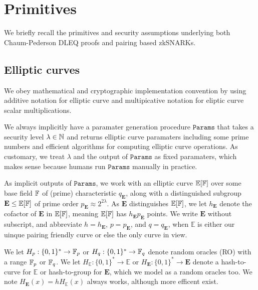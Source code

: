 
\section{Primitives}
\label{sec:lambda}

\def\ecE{{\mathbb{E}}}
\def\grE{{\mathbf{E}}}
\def\genE{E}
\def\genG{G}
\def\genB{K} %

\def\ecJ{{\mathbb{J}}}
\def\grJ{{\mathbf{J}}}
\def\genJ{J}

We briefly recall the primitives and security assumptions underlying
both Chaum-Pederson DLEQ proofs and pairing based zkSNARKs. 


\subsection{Elliptic curves}

We obey mathematical and cryptographic implementation convention by using additive notation for elliptic curve and multipicative notation for eliptic curve scalar multiplications. 

We always implicitly have a paramater generation procedure $\mathtt{Params}$ that takes a security level $\lambda \in \mathbb{N}$ and returns elliptic curve paramaters including some prime numbers and efficient algorithms for computing elliptic curve operations.  As customary, we treat $\lambda$ and the output of $\mathtt{Params}$ as fixed paramaters, which makes sense because humans run $\mathtt{Params}$ manually in practice. 

As implicit outputs of $\mathtt{Params}$, we work with an elliptic curve $\ecE[\F]$ over some base field $\mathbb{F}$ of (prime) characteristic $q_{\grE}$, along with a distinguished subgroup $\grE \le \ecE[\F]$ of prime order $p_{\grE} \approx 2^{2\lambda}$.  As $\grE$ distinguishes $\ecE[\F]$, we let $h_{\grE}$ denote the cofactor of $\grE$ in $\ecE[\F]$, meaning $\ecE[\F]$ has $h_{\grE} p_{\grE}$ points.
We write $\grE$ without subscript, and abbreviate $h = h_{\grE}$, $p = p_{\grE}$, and $q = q_{\grE}$, when $\ecE$ is either our uinque pairing friendly curve or else the only curve in view.

We let $H_p : \{0,1\}^* \to \mathbb{F}_p$ or $H_q : \{0,1\}^* \to \mathbb{F}_q$ denote random oracles (RO) with a range $\mathbb{F}_p$ or $\mathbb{F}_q$.  We let $H_\ecE : \{0,1\}^* \to \ecE$ or $H_\grE : \{0,1\}^* \to \grE$ denote a hash-to-curve for $\ecE$ or hash-to-group for $\grE$, which we model as a random oracles too.  We note $H_\grE(x) = h H_\ecE(x)$ always works, although more efficent exist.

